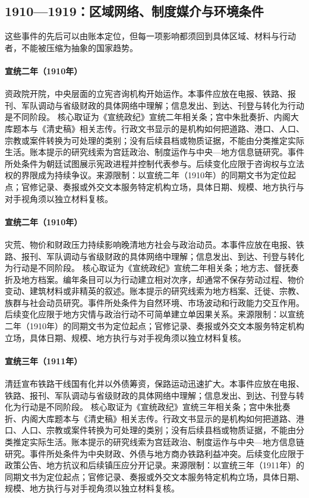 \subsection{1910—1919：区域网络、制度媒介与环境条件}
这些事件的先后可以由账本定位，但每一项影响都须回到具体区域、材料与行动者，不能被压缩为抽象的国家趋势。
\hypertarget{civic:EQ-1910-ZIZHENG-YUAN}{}\paragraph{宣统二年（1910年）}资政院开院，中央层面的立宪咨询机构开始运作。本事件应放在电报、铁路、报刊、军队调动与省级财政的具体网络中理解；信息发出、到达、刊登与转化为行动是不同阶段。 核心取证为《宣统政纪》宣统二年相关条；宫中朱批奏折、内阁大库题本与《清史稿》相关志传。行政文书显示的是机构如何把道路、港口、人口、宗教或案件转换为可处理的类别；没有后续县档或物质证据，不能由分类推定实际生活。账本提示的研究线索为宫廷政治、制度运作与中央—地方信息链研究。事件所处条件为朝廷试图展示宪政进程并控制代表参与。后续变化应限于咨询权与立法权的界限成为持续争议。来源限制：以宣统二年（1910年）的同期文书为定位起点；官修记录、奏报或外交文本服务特定机构立场，具体日期、规模、地方执行与对手视角须以独立材料复核。
\hypertarget{civic:EQ-1910-FAMINE-AND-UNREST}{}\paragraph{宣统二年（1910年）}灾荒、物价和财政压力持续影响晚清地方社会与政治动员。本事件应放在电报、铁路、报刊、军队调动与省级财政的具体网络中理解；信息发出、到达、刊登与转化为行动是不同阶段。 核心取证为《宣统政纪》宣统二年相关条；地方志、督抚奏折及地方档案。编年条目可以为行动建立相对次序，却通常不保存劳动过程、物价变动、建筑材料或非精英的叙述。账本提示的研究线索为地方档案、迁徙、宗教、族群与社会动员研究。事件所处条件为自然环境、市场波动和行政能力交互作用。后续变化应限于地方灾情与政治行动不可简单建立单因果关系。来源限制：以宣统二年（1910年）的同期文书为定位起点；官修记录、奏报或外交文本服务特定机构立场，具体日期、规模、地方执行与对手视角须以独立材料复核。
\hypertarget{civic:EQ-1911-RAILWAY-NATIONALIZATION}{}\paragraph{宣统三年（1911年）}清廷宣布铁路干线国有化并以外债筹资，保路运动迅速扩大。本事件应放在电报、铁路、报刊、军队调动与省级财政的具体网络中理解；信息发出、到达、刊登与转化为行动是不同阶段。 核心取证为《宣统政纪》宣统三年相关条；宫中朱批奏折、内阁大库题本与《清史稿》相关志传。行政文书显示的是机构如何把道路、港口、人口、宗教或案件转换为可处理的类别；没有后续县档或物质证据，不能由分类推定实际生活。账本提示的研究线索为宫廷政治、制度运作与中央—地方信息链研究。事件所处条件为中央财政、外债与地方商办铁路利益冲突。后续变化应限于政策公告、地方抗议和后续镇压应分开记录。来源限制：以宣统三年（1911年）的同期文书为定位起点；官修记录、奏报或外交文本服务特定机构立场，具体日期、规模、地方执行与对手视角须以独立材料复核。
